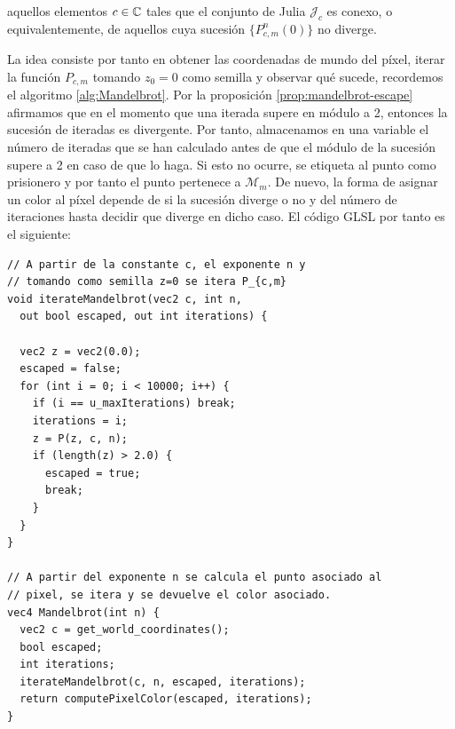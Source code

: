  aquellos elementos $c\in\mathbb{C}$ tales que el conjunto de Julia $\mathcal{J}_c$ es conexo, o equivalentemente, de aquellos cuya sucesión $\{P_{c,m}^n(0)\}$ no diverge.

La idea consiste por tanto en obtener las coordenadas de mundo del píxel, iterar la función $P_{c,m}$ tomando $z_0=0$ como semilla y observar qué sucede, recordemos el algoritmo \ref{alg:Mandelbrot}. Por la proposición \ref{prop:mandelbrot-escape} afirmamos que en el momento que una iterada supere en módulo a 2, entonces la sucesión de iteradas es divergente. Por tanto, almacenamos en una variable el número de iteradas que se han calculado antes de que el módulo de la sucesión supere a 2 en caso de que lo haga. Si esto no ocurre, se etiqueta al punto como prisionero y por tanto el punto pertenece a $\mathcal{M}_m$. De nuevo, la forma de asignar un color al píxel depende de si la sucesión diverge o no y del número de iteraciones hasta decidir que diverge en dicho caso. El código GLSL por tanto es el siguiente:

\begin{lstlisting}
// A partir de la constante c, el exponente n y 
// tomando como semilla z=0 se itera P_{c,m} 
void iterateMandelbrot(vec2 c, int n, 
  out bool escaped, out int iterations) {
    
  vec2 z = vec2(0.0);
  escaped = false;
  for (int i = 0; i < 10000; i++) {
    if (i == u_maxIterations) break;
    iterations = i;
    z = P(z, c, n);
    if (length(z) > 2.0) {
      escaped = true;
      break;
    }
  }
}

// A partir del exponente n se calcula el punto asociado al
// pixel, se itera y se devuelve el color asociado.
vec4 Mandelbrot(int n) {
  vec2 c = get_world_coordinates();
  bool escaped;
  int iterations;
  iterateMandelbrot(c, n, escaped, iterations);
  return computePixelColor(escaped, iterations);
}
\end{lstlisting}

